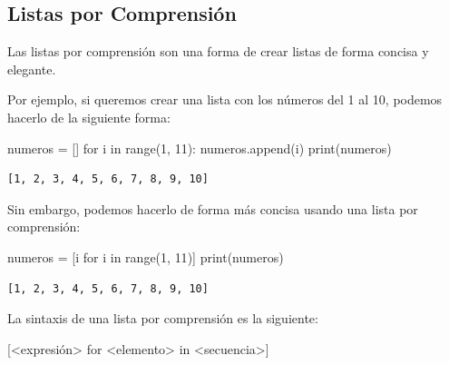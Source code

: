 \documentclass[
  letterpaper,
  DIV=11,
  numbers=noendperiod]{scrreprt}
\newenvironment{Shaded}{\begin{snugshade}}{\end{snugshade}}
\newcommand{\BuiltInTok}[1]{\textcolor[rgb]{0.00,0.23,0.31}{#1}}
\newcommand{\ControlFlowTok}[1]{\textcolor[rgb]{0.00,0.23,0.31}{#1}}
\newcommand{\DecValTok}[1]{\textcolor[rgb]{0.68,0.00,0.00}{#1}}
\newcommand{\KeywordTok}[1]{\textcolor[rgb]{0.00,0.23,0.31}{#1}}
\newcommand{\NormalTok}[1]{\textcolor[rgb]{0.00,0.23,0.31}{#1}}
\newcommand{\OperatorTok}[1]{\textcolor[rgb]{0.37,0.37,0.37}{#1}}
\begin{document}
\hypertarget{listas-por-comprensiuxf3n}{%
\subsection{Listas por Comprensión}\label{listas-por-comprensiuxf3n}}

Las listas por comprensión son una forma de crear listas de forma
concisa y elegante.

Por ejemplo, si queremos crear una lista con los números del 1 al 10,
podemos hacerlo de la siguiente forma:

\begin{Shaded}
\begin{Highlighting}[]
\NormalTok{numeros }\OperatorTok{=}\NormalTok{ []}
\ControlFlowTok{for}\NormalTok{ i }\KeywordTok{in} \BuiltInTok{range}\NormalTok{(}\DecValTok{1}\NormalTok{, }\DecValTok{11}\NormalTok{):}
\NormalTok{    numeros.append(i)}
\BuiltInTok{print}\NormalTok{(numeros)}
\end{Highlighting}
\end{Shaded}

\begin{verbatim}
[1, 2, 3, 4, 5, 6, 7, 8, 9, 10]
\end{verbatim}

Sin embargo, podemos hacerlo de forma más concisa usando una lista por
comprensión:

\begin{Shaded}
\begin{Highlighting}[]
\NormalTok{numeros }\OperatorTok{=}\NormalTok{ [i }\ControlFlowTok{for}\NormalTok{ i }\KeywordTok{in} \BuiltInTok{range}\NormalTok{(}\DecValTok{1}\NormalTok{, }\DecValTok{11}\NormalTok{)]}
\BuiltInTok{print}\NormalTok{(numeros)}
\end{Highlighting}
\end{Shaded}

\begin{verbatim}
[1, 2, 3, 4, 5, 6, 7, 8, 9, 10]
\end{verbatim}

La sintaxis de una lista por comprensión es la siguiente:

\begin{Shaded}
\begin{Highlighting}[]
\NormalTok{[}\OperatorTok{\textless{}}\NormalTok{expresión}\OperatorTok{\textgreater{}} \ControlFlowTok{for} \OperatorTok{\textless{}}\NormalTok{elemento}\OperatorTok{\textgreater{}} \KeywordTok{in} \OperatorTok{\textless{}}\NormalTok{secuencia}\OperatorTok{\textgreater{}}\NormalTok{]}
\end{Highlighting}
\end{Shaded}
\end{document}

